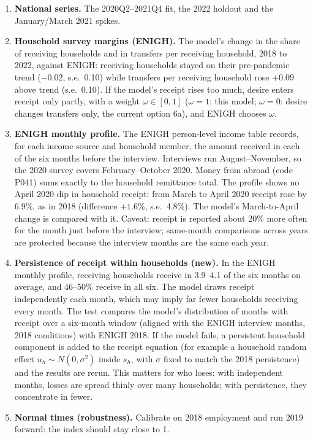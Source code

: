 \documentclass[11pt]{article}
\begin{document}
\begin{enumerate}[leftmargin=*]
\item \textbf{National series.} The 2020Q2--2021Q4 fit, the 2022 holdout and the January/March 2021 spikes.
\item \textbf{Household survey margins (ENIGH).} The model's change in the share of receiving households and in transfers per receiving household, 2018 to 2022, against ENIGH: receiving households stayed on their pre-pandemic trend ($-0.02$, s.e.\ 0.10) while transfers per receiving household rose $+0.09$ above trend (s.e.\ 0.10). If the model's receipt rises too much, desire enters receipt only partly, with a weight $\omega \in [0,1]$ ($\omega = 1$: this model; $\omega = 0$: desire changes transfers only, the current option 6a), and ENIGH chooses $\omega$.
\item \textbf{ENIGH monthly profile.} The ENIGH person-level income table records, for each income source and household member, the amount received in each of the six months before the interview. Interviews run August--November, so the 2020 survey covers February--October 2020. Money from abroad (code P041) sums exactly to the household remittance total. The profile shows no April 2020 dip in household receipt: from March to April 2020 receipt rose by 6.9\%, as in 2018 (difference $+1.6\%$, s.e.\ 4.8\%). The model's March-to-April change is compared with it. Caveat: receipt is reported about 20\% more often for the month just before the interview; same-month comparisons across years are protected because the interview months are the same each year.
\item \textbf{Persistence of receipt within households (new).} In the ENIGH monthly profile, receiving households receive in 3.9--4.1 of the six months on average, and 46--50\% receive in all six. The model draws receipt independently each month, which may imply far fewer households receiving every month. The test compares the model's distribution of months with receipt over a six-month window (aligned with the ENIGH interview months, 2018 conditions) with ENIGH 2018. If the model fails, a persistent household component is added to the receipt equation (for example a household random effect $u_h \sim N(0, \sigma^2)$ inside $s_h$, with $\sigma$ fixed to match the 2018 persistence) and the results are rerun. This matters for who loses: with independent months, losses are spread thinly over many households; with persistence, they concentrate in fewer.
\item \textbf{Normal times (robustness).} Calibrate on 2018 employment and run 2019 forward: the index should stay close to 1.
\end{enumerate}
\end{document}
